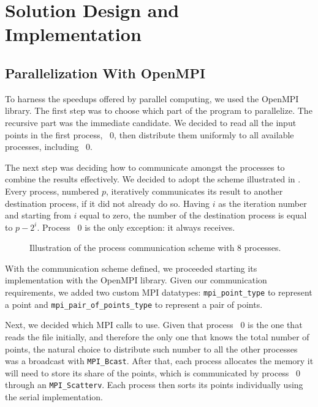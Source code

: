 \section{Solution Design and Implementation}
\label{sec:parallelization}

\subsection{Parallelization With OpenMPI}
To harness the speedups offered by parallel computing, we used the OpenMPI library.
The first step was to choose which part of the program to parallelize.
The recursive part was the immediate candidate.
We decided to read all the input points in the first process, \textnumero~0, then distribute them uniformly to all available processes, including \textnumero~0.

The next step was deciding how to communicate amongst the processes to combine the results effectively.
We decided to adopt the scheme illustrated in
.
Every process, numbered $p$, iteratively communicates its result to another destination process, if it did not already do so.
Having $i$ as the iteration number and starting from $i$ equal to zero, the number of the destination process is equal to $p-2^i$.
Process \textnumero~0 is the only exception: it always receives.

\begin{figure}[ht]
    \centering
    
    \caption{Illustration of the process communication scheme with 8 processes.}
    \label{fig:albero_bell_albero}
\end{figure}

With the communication scheme defined, we proceeded starting its implementation with the OpenMPI library.
Given our communication requirements, we added two custom MPI datatypes: \verb|mpi_point_type| to represent a point and \verb|mpi_pair_of_points_type|
to represent a pair of points.

Next, we decided which MPI calls to use.
Given that process \textnumero~0 is the one that reads the file initially, and therefore the only one that knows the total number of points, the natural choice to distribute such number to all the other processes was a broadcast with \verb|MPI_Bcast|.
After that, each process allocates the memory it will need to store its share of the points, which is communicated by process \textnumero~0 through an \verb|MPI_Scatterv|.
Each process then sorts its points individually using the serial implementation.

